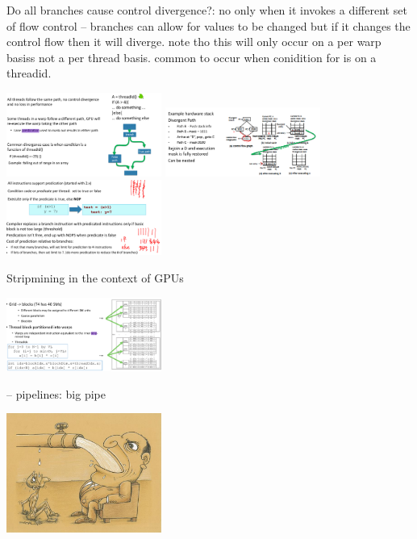 \documentclass[letter,8pt,landscape]{article}
\begin{document}
\begin{multicols}{3}
  Do all branches cause control divergence?: no only when it invokes a different
set of flow control -- branches can allow for values to be changed but if it
changes the control flow then it will diverge. note tho this will only occur on
a per warp basiss not a per thread basis. common to occur when conidition for is
on a threadid.
  \begin{center}
    \includegraphics[width=2in]{images/gpu-predication.jpg}
    \includegraphics[width=2in]{images/gpu-divergence.jpg}
    \includegraphics[width=2in]{images/cuda-predication.jpg}
  \end{center}

  Stripmining in the context of GPUs
  \begin{center}
    \includegraphics[width=2in]{images/gpu-strip.jpg}
  \end{center}

  – pipelines: big pipe
  \begin{center}
    \includegraphics[width=2in]{images/pipe.jpg}
  \end{center}


\end{multicols}
\end{document}
